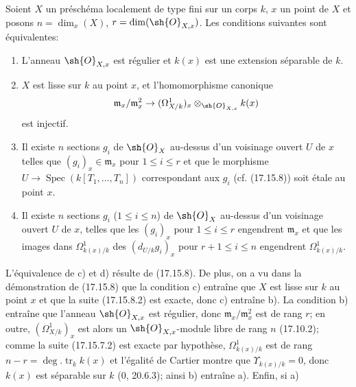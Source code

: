 \begin{corollary}[17.15.9]
\label{IV.17.15.9}
Soient $X$ un préschéma localement de type fini sur un corps $k$, $x$ un point de $X$ et posons $n=\dim_x(X)$, $r=\dim(\sh{O}_{X,x})$. Les conditions suivantes sont équivalentes:
\begin{enumerate}
  \item[a)] L'anneau $\sh{O}_{X,x}$ est régulier et $k(x)$ est une extension séparable de $k$.
  \item[b)] $X$ est lisse sur $k$ au point $x$, et l'homomorphisme canonique
  \[
  \mathfrak m_x/\mathfrak m_x^2\to(\Omega^1_{X/k})_x\otimes_{\sh{O}_{X,x}}k(x)
  \]
  est injectif.
  \item[c)] Il existe $n$ sections $g_i$ de $\sh{O}_X$ au-dessus d'un voisinage ouvert $U$ de $x$ telles que $(g_i)_x\in\mathfrak m_x$ pour $1\leq i\leq r$ et que le morphisme $U\to\operatorname{Spec}(k[T_1,\ldots,T_n])$ correspondant aux $g_i$ (cf. (17.15.8)) soit étale au point $x$.
  \item[d)] Il existe $n$ sections $g_i$ ($1\leq i\leq n$) de $\sh{O}_X$ au-dessus d'un voisinage ouvert $U$ de $x$, telles que les $(g_i)_x$ pour $1\leq i\leq r$ engendrent $\mathfrak m_x$ et que les images dans $\Omega^1_{k(x)/k}$ des $(d_{U/k}g_i)_x$ pour $r+1\leq i\leq n$ engendrent $\Omega^1_{k(x)/k}$.
\end{enumerate}
\end{corollary}

L'équivalence de c) et d) résulte de (17.15.8). De plus, on a vu dans la démonstration de (17.15.8) que la condition c) entraîne que $X$ est lisse sur $k$ au point $x$ et que la suite (17.15.8.2) est exacte, donc c) entraîne b). La condition b) entraîne que l'anneau $\sh{O}_{X,x}$ est régulier, donc $\mathfrak m_x/\mathfrak m_x^2$ est de rang $r$; en outre, $(\Omega^1_{X/k})_x$ est alors un $\sh{O}_{X,x}$-module libre de rang $n$ (17.10.2); comme la suite (17.15.7.2) est exacte par hypothèse, $\Omega^1_{k(x)/k}$ est de rang $n-r=\deg.\operatorname{tr}_k k(x)$ et l'égalité de Cartier montre que $\Upsilon_{k(x)/k}=0$, donc $k(x)$ est séparable sur $k$ (0, 20.6.3); ainsi b) entraîne a). Enfin, si a)

